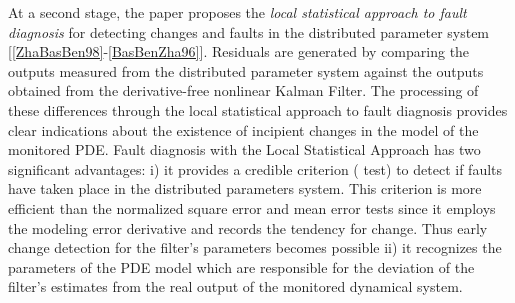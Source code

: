 \documentclass[journal]{IEEEtran}
\begin{document}
\noindent At a second stage, the paper proposes the \textit{local statistical approach to fault diagnosis} for detecting changes and faults in the distributed parameter system  [\ref{ZhaBasBen98}-\ref{BasBenZha96}]. Residuals are generated by comparing the outputs measured from the distributed parameter system against the outputs obtained from the derivative-free nonlinear Kalman Filter. The processing of these differences through the local statistical approach to fault diagnosis provides clear indications about the existence of incipient changes in the model of the monitored PDE. Fault diagnosis with the Local Statistical Approach has two significant advantages: i) it provides a credible criterion ( test) to detect if faults have taken place in the distributed parameters system. This criterion is more efficient than the normalized square error and mean error tests since it employs the modeling error derivative and records the tendency for change. Thus early change detection for the filter's parameters becomes possible ii) it recognizes the parameters of the PDE model which are responsible for the deviation of the filter's estimates from the real output of the monitored dynamical system.
\end{document}
